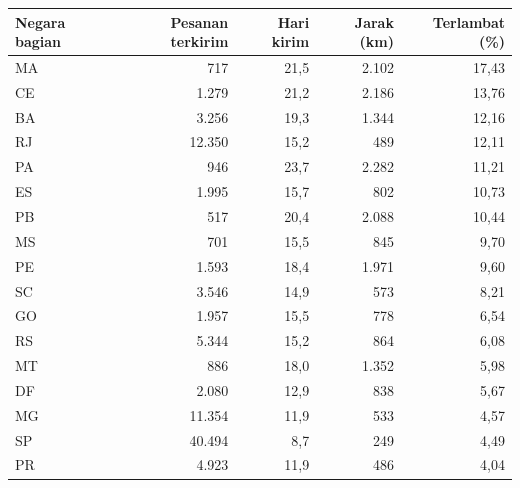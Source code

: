 \begin{tabular}{lrrrr}
\toprule
Negara bagian & Pesanan terkirim & Hari kirim & Jarak (km) & Terlambat (\%) \\
\midrule
MA & 717 & 21,5 & 2.102 & 17,43 \\
CE & 1.279 & 21,2 & 2.186 & 13,76 \\
BA & 3.256 & 19,3 & 1.344 & 12,16 \\
RJ & 12.350 & 15,2 & 489 & 12,11 \\
PA & 946 & 23,7 & 2.282 & 11,21 \\
ES & 1.995 & 15,7 & 802 & 10,73 \\
PB & 517 & 20,4 & 2.088 & 10,44 \\
MS & 701 & 15,5 & 845 & 9,70 \\
PE & 1.593 & 18,4 & 1.971 & 9,60 \\
SC & 3.546 & 14,9 & 573 & 8,21 \\
GO & 1.957 & 15,5 & 778 & 6,54 \\
RS & 5.344 & 15,2 & 864 & 6,08 \\
MT & 886 & 18,0 & 1.352 & 5,98 \\
DF & 2.080 & 12,9 & 838 & 5,67 \\
MG & 11.354 & 11,9 & 533 & 4,57 \\
SP & 40.494 & 8,7 & 249 & 4,49 \\
PR & 4.923 & 11,9 & 486 & 4,04 \\
\bottomrule
\end{tabular}

